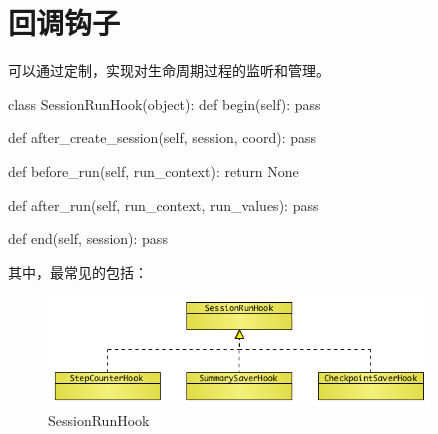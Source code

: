 \section{回调钩子}

\begin{content}

可以通过定制，实现对生命周期过程的监听和管理。

\begin{leftbar}
\begin{python}
class SessionRunHook(object):
  def begin(self):
    pass

  def after_create_session(self, session, coord):
    pass

  def before_run(self, run_context):
    return None

  def after_run(self, run_context, run_values):
    pass

  def end(self, session):
    pass
\end{python}
\end{leftbar}

其中，最常见的包括：

\begin{enum}
\end{enum}

\begin{figure}[!htbp]
\centering
\includegraphics[width=0.9\textwidth]{figures/py-train-session-run-hook.png}
\caption{SessionRunHook}
 \label{fig:py-train-session-run-hook}
\end{figure}

\end{content}






